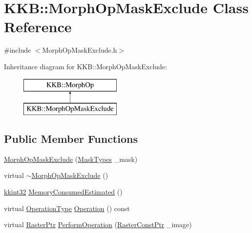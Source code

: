 \hypertarget{class_k_k_b_1_1_morph_op_mask_exclude}{}\section{K\+KB\+:\+:Morph\+Op\+Mask\+Exclude Class Reference}
\label{class_k_k_b_1_1_morph_op_mask_exclude}


{\ttfamily \#include $<$Morph\+Op\+Mask\+Exclude.\+h$>$}

Inheritance diagram for K\+KB\+:\+:Morph\+Op\+Mask\+Exclude\+:\begin{figure}[H]
\begin{center}
\leavevmode
\includegraphics[height=2.000000cm]{class_k_k_b_1_1_morph_op_mask_exclude}
\end{center}
\end{figure}
\subsection*{Public Member Functions}
\begin{DoxyCompactItemize}
\item 
\hyperlink{class_k_k_b_1_1_morph_op_mask_exclude_ace26097ca13e4b64948f7fb282f2db8e}{Morph\+Op\+Mask\+Exclude} (\hyperlink{class_k_k_b_1_1_morph_op_a9eaa0383bf9e046da208af397e7e35eb}{Mask\+Types} \+\_\+mask)
\item 
virtual \hyperlink{class_k_k_b_1_1_morph_op_mask_exclude_a7c80eced0f5c4da968f9329f048a4905}{$\sim$\+Morph\+Op\+Mask\+Exclude} ()
\item 
\hyperlink{namespace_k_k_b_a8fa4952cc84fda1de4bec1fbdd8d5b1b}{kkint32} \hyperlink{class_k_k_b_1_1_morph_op_mask_exclude_a334038ee506236c8de5bff0734692d6b}{Memory\+Consumed\+Estimated} ()
\item 
virtual \hyperlink{class_k_k_b_1_1_morph_op_a32070d9c14d16849873a8a409f5b0d69}{Operation\+Type} \hyperlink{class_k_k_b_1_1_morph_op_mask_exclude_a084a3e895aada937a5f24255a868635f}{Operation} () const 
\item 
virtual \hyperlink{namespace_k_k_b_a80d46bd24db644a022c863bce8ae3633}{Raster\+Ptr} \hyperlink{class_k_k_b_1_1_morph_op_mask_exclude_a25875098567fa8ecd074110a1cccf627}{Perform\+Operation} (\hyperlink{namespace_k_k_b_a5acfa7402dc4df1769f90d3dc8ddfc2c}{Raster\+Const\+Ptr} \+\_\+image)
\end{DoxyCompactItemize}
